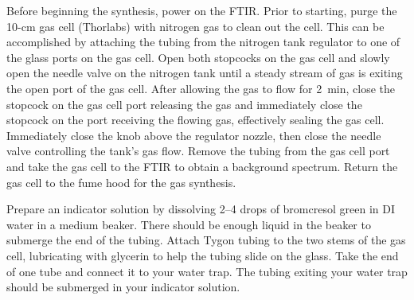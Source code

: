 Before beginning the synthesis, power on the FTIR. 
Prior to starting, purge the 10-cm gas cell (Thorlabs) with nitrogen gas to clean out the cell.
This can be accomplished by attaching the tubing from the nitrogen tank regulator to one of the glass ports on the gas cell. 
Open both stopcocks on the gas cell and slowly open the needle valve on the nitrogen tank until a steady stream of gas is exiting the open port of the gas cell. 
After allowing the gas to flow for \qty{2}{\minute}, close the stopcock on the gas cell port releasing the gas and immediately close the stopcock on the port receiving the flowing gas, effectively sealing the gas cell. 
Immediately close the knob above the regulator nozzle, then close the needle valve controlling the tank's gas flow. 
Remove the tubing from the gas cell port and take the gas cell to the FTIR to obtain a background spectrum. 
Return the gas cell to the fume hood for the gas synthesis. 

Prepare an indicator solution by dissolving \numrange{2}{4} drops of bromcresol green in DI water in a medium beaker.
There should be enough liquid in the beaker to submerge the end of the tubing.  
Attach Tygon tubing to the two stems of the gas cell, lubricating with glycerin to help the tubing slide on the glass. 
Take the end of one tube and connect it to your water trap. The tubing exiting your water trap should be submerged in your indicator solution. 

